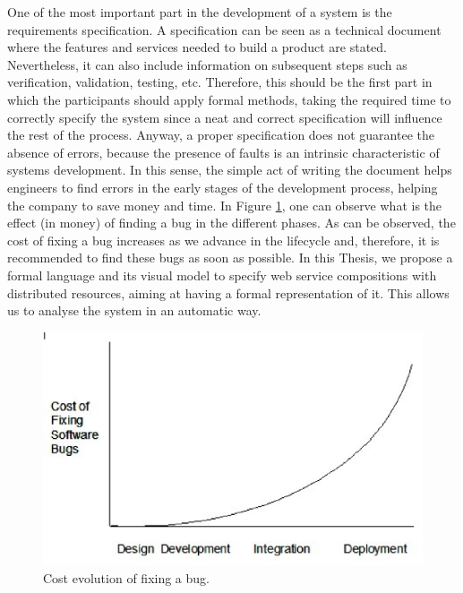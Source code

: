 One of the most important part in the development of a system is the requirements specification. 
A specification can be seen as a technical document where the features and services needed 
to build a product are stated. Nevertheless, it can also include information on 
subsequent steps such as verification, validation, testing, etc. Therefore, 
this should be the first part in which the participants should apply formal methods, taking the 
required time to correctly specify the system since a neat and correct specification will influence the 
rest of the process.
Anyway, a proper specification does not guarantee the absence of errors, because the 
presence of faults is an intrinsic characteristic of systems development. In this sense, 
the simple act of writing the document helps engineers to find errors in the early stages 
of the development process, helping the company to save  money and time. 
In Figure \ref{fig:coste}, one can observe what is the effect (in money) of finding a bug
in the different phases. As can be observed, the cost of fixing a bug increases as 
we advance in the lifecycle and, therefore, it is recommended to find these bugs as soon as possible. 
In this Thesis, we propose a formal language and its visual model to specify web service compositions 
with distributed resources, aiming at having a formal representation of it. This allows us to analyse 
the system in an automatic way. 

\begin{figure}
\begin{center}
  \includegraphics[scale=0.5, width =\columnwidth]{Figures/coste}
\end{center}
  \caption{Cost evolution of fixing a bug.}
  \label{fig:coste}
\end{figure}

